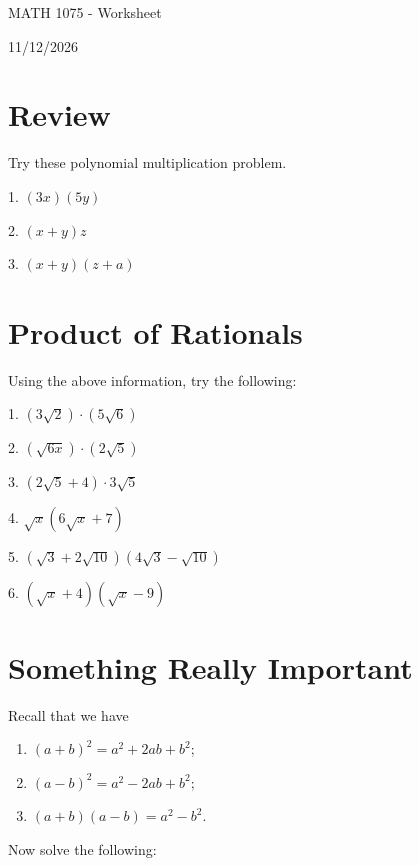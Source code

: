 \documentclass[12pt]{article}
\begin{document}
\begin{center}
    {\LARGE MATH 1075 - Worksheet}

    \vspace{2em}

    {\large 11/12/2026}
\end{center}
\section{Review}
Try these polynomial multiplication problem.

\vspace{1.5em}

1. $(3x)(5y)$

\vspace{4.5em} 

2. $(x+y)z$

\vspace{4.5em} 

3. $(x+y)(z+a)$

\vspace{4.5em}

\section{Product of Rationals}
Using the above information, try the following: 

\vspace{1.5em} 

1. $(3\sqrt{2})\cdot (5\sqrt{6})$ 

\vspace{4.5em} 

2. $(\sqrt{6x})\cdot(2\sqrt{5})$ 

\vspace{4.5em} 

3. $(2\sqrt{5}+4)\cdot 3\sqrt{5}$ 

\vspace{4.5em} 

4. $\sqrt{x}(6\sqrt{x}+7)$ 

\vspace{4.5em} 

5. $(\sqrt{3}+2\sqrt{10})(4\sqrt{3}-\sqrt{10})$ 

\vspace{4.5em} 

6. $(\sqrt{x}+4)(\sqrt{x}-9)$ 

\vspace{4.5em} 

\section{Something Really Important} 
Recall that we have 
\begin{enumerate}
\item $(a+b)^{2}=a^{2}+2ab+b^{2}$; 
\item $(a-b)^{2}=a^{2}-2ab+b^{2}$; 
\item $(a+b)(a-b)=a^{2}-b^{2}.$ 
\end{enumerate} Now solve the following: 
\end{document}
